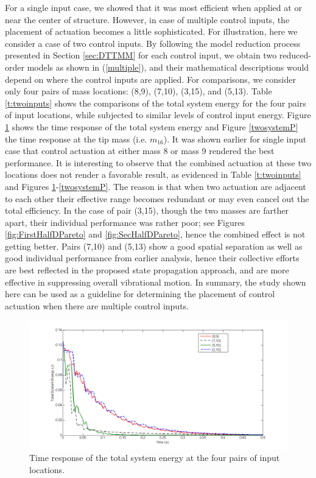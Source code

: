 \documentclass[11pt]{ucthesis}
\begin{document}
For a single input case, we showed that it was most efficient when applied at or near the center of structure. However, in case of multiple control inputs, the placement of actuation becomes a little sophisticated. For illustration, here we consider a case of two control inputs. By following the model reduction process presented in Section \ref{sec:DTTMM} for each control input, we obtain two reduced-order models as shown in (\ref{multiple}), and their mathematical descriptions would depend on where the control inputs are applied. For comparisons, we consider only four pairs of mass locations: (8,9), (7,10), (3,15), and (5,13). Table \ref{t:twoinputs} shows the comparisons of the total system energy for the four pairs of input locations, while subjected to similar levels of control input energy. Figure \ref{twosystemE} shows the time response of the total system energy and Figure \ref{twosystemP} the time response at the tip mass (i.e. $m_{16}$). It was shown earlier for single input case that control actuation at either mass 8 or mass 9 rendered the best performance. It is interesting to observe that the combined actuation at these two locations does not render a favorable result, as evidenced in Table \ref{t:twoinputs} and Figures \ref{twosystemE}-\ref{twosystemP}. The reason is that when two actuation are adjacent to each other their effective range becomes redundant or may even cancel out the total efficiency. In the case of pair (3,15), though the two masses are farther apart, their individual performance was rather poor; see Figures \ref{fig:FirstHalfDPareto} and \ref{fig:SecHalfDPareto}, hence the combined effect is not getting better. Pairs (7,10) and (5,13) show a good spatial separation as well as good individual performance from earlier analysis, hence their collective efforts are best reflected in the proposed state propagation approach, and are more effective in suppressing overall vibrational motion. In summary, the study shown here can be used as a guideline for determining the placement of control actuation when there are multiple control inputs.

\begin{figure}[h]
\centering
\includegraphics[width=1\linewidth]{Figures/twoinputE.png}
\caption{Time response of the total system energy at the four pairs of input locations.}
\label{twosystemE}
\end{figure}
\end{document}
